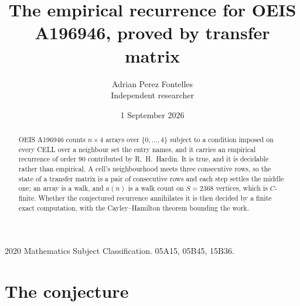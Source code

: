 \documentclass[11pt,a4paper]{article}
\title{The empirical recurrence for OEIS A196946, proved by transfer matrix}
\author{Adrian Perez Fontelles\\ \small Independent researcher}
\date{1 September 2026}
\theoremstyle{plain}
\theoremstyle{definition}
\begin{document}
\maketitle

\begin{abstract}
OEIS A196946 counts $n\times4$ arrays over $\{0,\dots,4\}$ subject to a condition imposed on
every CELL over a neighbour set the entry names, and it carries an empirical recurrence of
order $90$ contributed by R.~H.~Hardin. It is true, and it is decidable rather than
empirical. A cell's neighbourhood meets three consecutive rows, so the state of a transfer
matrix is a pair of consecutive rows and each step settles the middle one; an array is a
walk, and $a(n)$ is a walk count on $S=2368$ vertices, which is $C$-finite. Whether the
conjectured recurrence annihilates it is then decided by a finite exact computation, with the
Cayley--Hamilton theorem bounding the work.
\end{abstract}

\noindent\small 2020 Mathematics Subject Classification. 05A15, 05B45, 15B36.\normalsize

\section{The conjecture}
\end{document}
